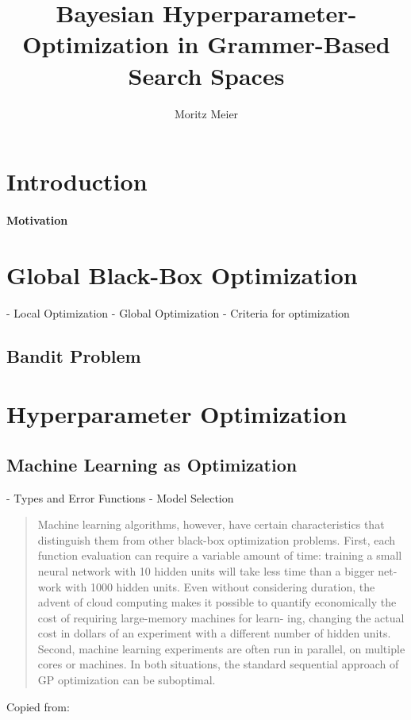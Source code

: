 \documentclass[english]{article}
\begin{document}
  

\title{Bayesian Hyperparameter-Optimization in Grammer-Based Search Spaces}
\author{Moritz Meier}
\maketitle
\tableofcontents
\newpage

\section{Introduction}
\paragraph{Motivation}

\section{Global Black-Box Optimization}
 - Local Optimization
 - Global Optimization
 - Criteria for optimization

\subsection{Bandit Problem}

\section{Hyperparameter Optimization}

\subsection{Machine Learning as Optimization}
 - Types and Error Functions
 - Model Selection

\begin{quote}
Machine learning algorithms, however, have certain characteristics that distinguish them from other
black-box optimization problems.  First, each function evaluation can require a variable amount of
time:  training a small neural network with 10 hidden units will take less time than a bigger net-
work with 1000 hidden units.  Even without considering duration, the advent of cloud computing
makes it possible to quantify economically the cost of requiring large-memory machines for learn-
ing, changing the actual cost in dollars of an experiment with a different number of hidden units.
Second, machine learning experiments are often run in parallel, on multiple cores or machines.  In
both situations, the standard sequential approach of GP optimization can be suboptimal.
\end{quote}
Copied from: \cite{snoek_practical_2012}
\end{document}
